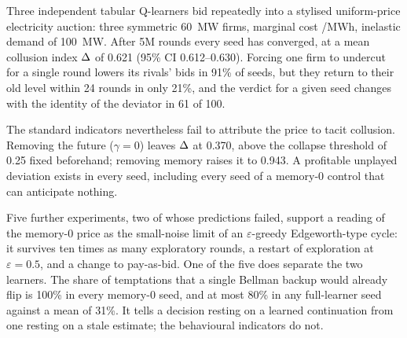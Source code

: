 Three independent tabular Q-learners bid repeatedly into a stylised uniform-price electricity auction: three symmetric 60~MW firms, marginal cost /MWh, inelastic demand of 100~MW. After 5M rounds every seed has converged, at a mean collusion index $\Delta$ of 0.621 (95\% CI 0.612--0.630). Forcing one firm to undercut for a single round lowers its rivals' bids in 91\% of seeds, but they return to their old level within 24 rounds in only 21\%, and the verdict for a given seed changes with the identity of the deviator in 61 of 100.

The standard indicators nevertheless fail to attribute the price to tacit collusion. Removing the future ($\gamma = 0$) leaves $\Delta$ at 0.370, above the collapse threshold of 0.25 fixed beforehand; removing memory raises it to 0.943. A profitable unplayed deviation exists in every seed, including every seed of a memory-0 control that can anticipate nothing.

Five further experiments, two of whose predictions failed, support a reading of the memory-0 price as the small-noise limit of an $\varepsilon$-greedy Edgeworth-type cycle: it survives ten times as many exploratory rounds, a restart of exploration at $\varepsilon = 0.5$, and a change to pay-as-bid. One of the five does separate the two learners. The share of temptations that a single Bellman backup would already flip is 100\% in every memory-0 seed, and at most 80\% in any full-learner seed against a mean of 31\%. It tells a decision resting on a learned continuation from one resting on a stale estimate; the behavioural indicators do not.
